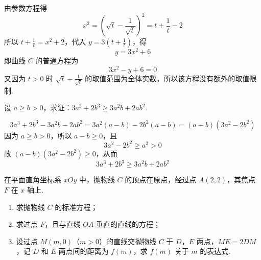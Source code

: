\begin{solution}
由参数方程得
\[
x^2=\left(\sqrt t-\frac1{\sqrt t}\right)^2=t+\frac1t-2
\]
所以 \(t+\frac1t=x^2+2\)，代入 \(y=3\left(t+\frac1t\right)\)，得
\[
y=3x^2+6
\]
即曲线 \(C\) 的普通方程为
\[
3x^2-y+6=0
\]
又因为 \(t>0\) 时 \(\sqrt t-\frac{1}{\sqrt t}\) 的取值范围为全体实数，所以该方程没有额外的取值限制.
\end{solution}

\reuseproblemnumber
\begin{problem}[D]
设 \(a\ge b>0\)，求证：\(3a^3+2b^3\ge3a^2b+2ab^2\).
\end{problem}

\begin{solution}
\[
3a^3+2b^3-3a^2b-2ab^2
=3a^2(a-b)-2b^2(a-b)
=(a-b)(3a^2-2b^2)
\]
因为 \(a\ge b>0\)，所以 \(a-b\ge0\)，且
\[
3a^2-2b^2\ge a^2>0
\]
故 \((a-b)(3a^2-2b^2)\ge0\)，从而
\[
3a^3+2b^3\ge3a^2b+2ab^2
\]
\end{solution}

\begin{problem}
在平面直角坐标系 \(xOy\) 中，抛物线 \(C\) 的顶点在原点，经过点 \(A(2,2)\)，其焦点 \(F\) 在 \(x\) 轴上.

\begin{enumerate}
\item 求抛物线 \(C\) 的标准方程；
\item 求过点 \(F\)，且与直线 \(OA\) 垂直的直线的方程；
\item 设过点 \(M(m,0)\)（\(m>0\)）的直线交抛物线 \(C\) 于 \(D\)，\(E\) 两点，\(ME=2DM\)，记 \(D\) 和 \(E\) 两点间的距离为 \(f(m)\)，求 \(f(m)\) 关于 \(m\) 的表达式.
\end{enumerate}

\end{problem}

